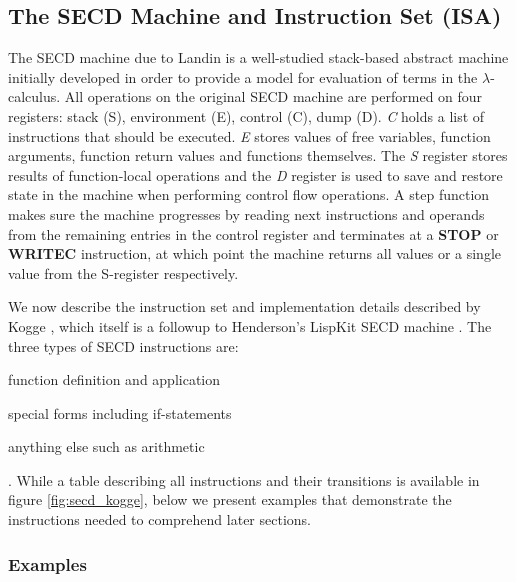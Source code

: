 \documentclass[a4paper,12pt,twoside,openright]{report}
\theoremstyle{definition}
\begin{document}
\subsection{The SECD Machine and Instruction Set (ISA)}
The SECD machine due to Landin \cite{landin1964mechanical} is a well-studied stack-based abstract machine initially developed in order to provide a model for evaluation of terms in the $\lambda$-calculus. All operations on the original SECD machine are performed on four registers: stack (S), environment (E), control (C), dump (D). \textit{C} holds a list of instructions that should be executed. \textit{E} stores values of free variables, function arguments, function return values and functions themselves. The \textit{S} register stores results of function-local operations and the \textit{D} register is used to save and restore state in the machine when performing control flow operations. A step function makes sure the machine progresses by reading next instructions and operands from the remaining entries in the control register and terminates at a \textbf{STOP} or \textbf{WRITEC} instruction, at which point the machine returns all values or a single value from the S-register respectively.

We now describe the instruction set and implementation details described by Kogge \cite{kogge1990architecture}, which itself is a followup to Henderson's LispKit SECD machine \cite{henderson1980functional}. The three types of SECD instructions are:
\begin{enumerate*}[label=(\arabic*)]
    \item function definition and application
    \item special forms including if-statements
    \item anything else such as arithmetic
\end{enumerate*}. While a table describing all instructions and their transitions is available in figure \ref{fig:secd_kogge}, below we present examples that demonstrate the instructions needed to comprehend later sections.

\subsubsection{Examples}\label{ssubsec:secd_example}
\end{document}

